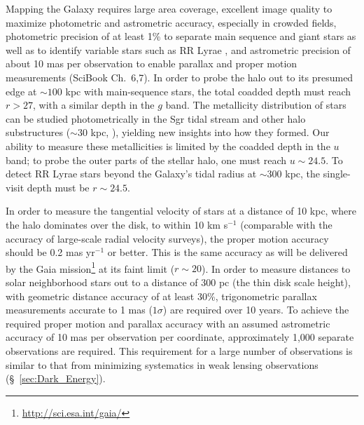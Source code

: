 Mapping the Galaxy requires large area coverage, excellent image
quality to maximize photometric and astrometric accuracy,
especially in crowded fields, photometric precision of at least 1\% to
separate main sequence and
giant stars \cite[e.g.,][]{2003ApJ...586..195H} as well as to identify variable
stars such as RR Lyrae \citep{2010ApJ...708..717S,2011ApJ...728..106S},
and astrometric precision of about 10 mas per observation to enable parallax and proper motion measurements
(SciBook Ch.~6,7). In order to probe the halo out to its presumed edge at $\sim100$ kpc \citep{2004ASPC..327..104I}
with main-sequence stars, the total coadded depth must reach $r > 27$, with a similar depth in the $g$ band.
The metallicity distribution of stars can be studied photometrically in the Sgr tidal stream
\cite[e.g., see][]{2003ApJ...599.1082M,2007ApJ...670..346C} and other halo substructures
($\sim 30$ kpc, \citealt{2007Natur.450.1020C}), yielding new insights into how
they formed.  Our ability to measure these metallicities is limited by
the coadded depth in the $u$ band; to probe the outer parts of the
stellar halo, one must reach
$u\sim24.5$. To detect RR Lyrae stars beyond the Galaxy's tidal radius at $\sim 300$ kpc, the single-visit depth must
be $r \sim  24.5$.

In order to measure the tangential velocity of stars at a distance of 10 kpc, where the halo dominates over the disk, to
within 10 km s$^{-1}$ (comparable with the accuracy of
large-scale radial velocity surveys), the proper motion
accuracy should be 0.2 mas yr$^{-1}$ or better. This is the same accuracy as will be delivered by the Gaia mission\footnote{\url{http://sci.esa.int/gaia/}} \citep{2001A&A...369..339P,2012Ap&SS.341...31D} at its faint limit ($r \sim 20$).
In order to measure distances to solar neighborhood stars out to a distance of 300 pc (the thin disk scale height),
with geometric distance accuracy of at least 30\%, trigonometric parallax measurements accurate to 1 mas ($1\sigma$)
are required over 10 years. To achieve the required proper motion and parallax accuracy with an assumed astrometric
accuracy of 10 mas per observation per coordinate, approximately 1,000
separate observations are required. This requirement for a large
number of observations is similar to that from minimizing
systematics in weak lensing observations (\S~\ref{sec:Dark_Energy}).



